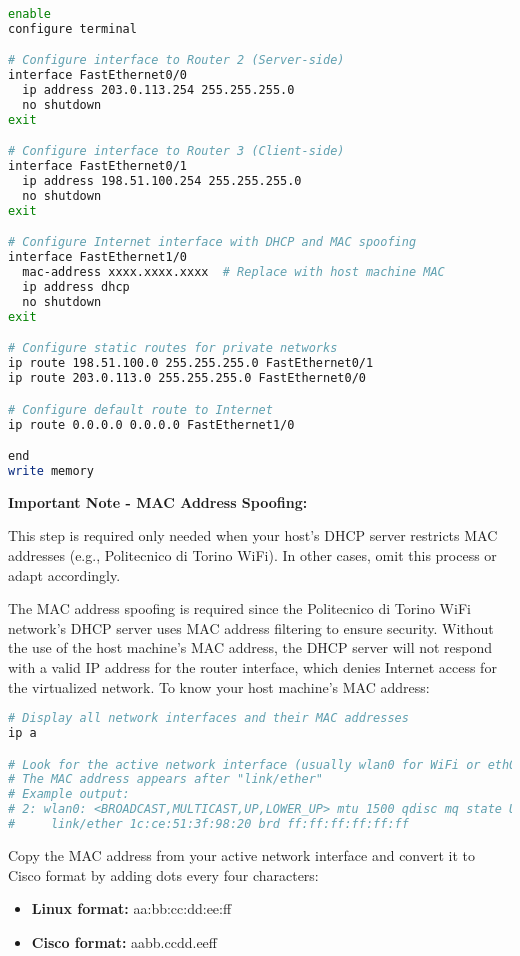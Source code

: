\begin{lstlisting}[language=bash]
enable
configure terminal

# Configure interface to Router 2 (Server-side)
interface FastEthernet0/0
  ip address 203.0.113.254 255.255.255.0
  no shutdown
exit

# Configure interface to Router 3 (Client-side)  
interface FastEthernet0/1
  ip address 198.51.100.254 255.255.255.0
  no shutdown
exit

# Configure Internet interface with DHCP and MAC spoofing
interface FastEthernet1/0
  mac-address xxxx.xxxx.xxxx  # Replace with host machine MAC
  ip address dhcp
  no shutdown
exit

# Configure static routes for private networks
ip route 198.51.100.0 255.255.255.0 FastEthernet0/1
ip route 203.0.113.0 255.255.255.0 FastEthernet0/0

# Configure default route to Internet
ip route 0.0.0.0 0.0.0.0 FastEthernet1/0

end
write memory
\end{lstlisting}

\noindent
\textbf{Important Note - MAC Address Spoofing:} 

\noindent
This step is required only needed when your host's DHCP server restricts MAC addresses (e.g., Politecnico di Torino WiFi). In other cases, omit this process or adapt accordingly.

\noindent
The MAC address spoofing is required since the Politecnico di Torino WiFi network's DHCP server uses MAC address filtering to ensure security. Without the use of the host machine's MAC address, the DHCP server will not respond with a valid IP address for the router interface, which denies Internet access for the virtualized network. To know your host machine's MAC address:

\begin{lstlisting}[language=bash]
# Display all network interfaces and their MAC addresses
ip a

# Look for the active network interface (usually wlan0 for WiFi or eth0 for Ethernet)
# The MAC address appears after "link/ether"
# Example output:
# 2: wlan0: <BROADCAST,MULTICAST,UP,LOWER_UP> mtu 1500 qdisc mq state UP group default qlen 1000
#     link/ether 1c:ce:51:3f:98:20 brd ff:ff:ff:ff:ff:ff
\end{lstlisting}

\noindent
Copy the MAC address from your active network interface and convert it to Cisco format by adding dots every four characters:
\begin{itemize}
    \item \textbf{Linux format:} aa:bb:cc:dd:ee:ff
    \item \textbf{Cisco format:} aabb.ccdd.eeff
\end{itemize}

